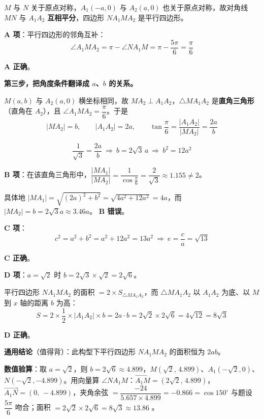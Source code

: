$M$ 与 $N$ 关于原点对称，$A_1(-a,0)$ 与 $A_2(a,0)$ 也关于原点对称，故对角线 $MN$ 与 $A_1A_2$ \textbf{互相平分}，四边形 $NA_1MA_2$ 是平行四边形。

\par\medskip

\textbf{A 项}：平行四边形的邻角互补：
\[\angle A_1MA_2=\pi-\angle NA_1M=\pi-\frac{5\pi}{6}=\frac\pi6\]

 \textbf{A 正确}。

\textbf{第三步，把角度条件翻译成 $a$、$b$ 的关系。}

$M(a,b)$ 与 $A_2(a,0)$ 横坐标相同，故 $MA_2\perp A_1A_2$，$\triangle MA_1A_2$ 是\textbf{直角三角形}（直角在 $A_2$），且 $\angle A_1MA_2=\dfrac\pi6$。于是
\[|MA_2|=b,\qquad |A_1A_2|=2a,\qquad \tan\frac\pi6=\frac{|A_1A_2|}{|MA_2|}=\frac{2a}{b}\]

\[\frac{1}{\sqrt3}=\frac{2a}{b}\ \Longrightarrow\ b=2\sqrt3\,a\ \Longrightarrow\ b^2=12a^2\]

\textbf{B 项}：在该直角三角形中，$\dfrac{|MA_1|}{|MA_2|}=\dfrac1{\cos\frac\pi6}=\dfrac{2}{\sqrt3}\approx1.155\ne2$。

具体地 $|MA_1|=\sqrt{(2a)^2+b^2}=\sqrt{4a^2+12a^2}=4a$，而 $|MA_2|=b=2\sqrt3a\approx3.46a$。 \textbf{B 错误}。

\textbf{C 项}：
\[c^2=a^2+b^2=a^2+12a^2=13a^2\ \Longrightarrow\ e=\frac ca=\sqrt{13}\]

 \textbf{C 正确}。

\textbf{D 项}：$a=\sqrt2$ 时 $b=2\sqrt3\times\sqrt2=2\sqrt6$。

平行四边形 $NA_1MA_2$ 的面积 $=2\times S_{\triangle MA_1A_2}$，而 $\triangle MA_1A_2$ 以 $A_1A_2$ 为底、以 $M$ 到 $x$ 轴的距离 $b$ 为高：
\[S=2\times\frac12\times|A_1A_2|\times b=2a\cdot b=2\sqrt2\times2\sqrt6=4\sqrt{12}=8\sqrt3\]

 \textbf{D 正确}。


\begin{gktip}
\textbf{通用结论}（值得背）：此构型下平行四边形 $NA_1MA_2$ 的面积恒为 $2ab$。

\textbf{数值验算}：取 $a=\sqrt2$，则 $b=2\sqrt6\approx4.899$，$M\left(\sqrt2,\,4.899\right)$、$A_1\left(-\sqrt2,0\right)$、$N\left(-\sqrt2,-4.899\right)$。用向量算 $\angle NA_1M$：$\overrightarrow{A_1M}=(2\sqrt2,\,4.899)$，$\overrightarrow{A_1N}=(0,\,-4.899)$，夹角余弦 $=\dfrac{-24}{5.657\times4.899}=-0.866=\cos150^\circ$  与题设 $\dfrac{5\pi}{6}$ 吻合；面积 $=2\sqrt2\times2\sqrt6=8\sqrt3\approx13.86$ 。
\end{gktip}

